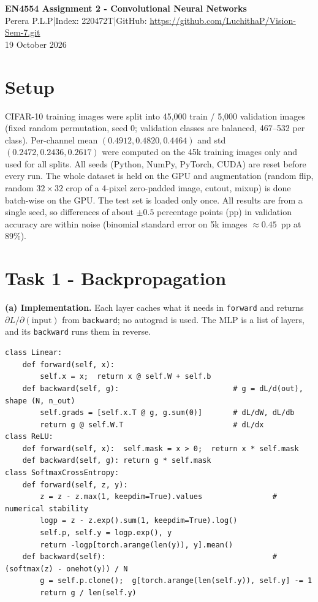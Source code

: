 \documentclass[10pt,a4paper]{article}
\newcommand{\studentname}{Perera P.L.P}
\newcommand{\indexno}{220472T}
\newcommand{\githuburl}{https://github.com/LuchithaP/Vision-Sem-7.git}
\begin{document}
\begin{center}
{\Large\bfseries EN4554 Assignment 2 - Convolutional Neural Networks}\\[4pt]
\studentname \quad|\quad Index: \indexno \quad|\quad GitHub: \url{\githuburl}\\[2pt]
{\small 19 October 2026}
\end{center}

\section*{Setup}
CIFAR-10 training images were split into 45{,}000 train / 5{,}000 validation images (fixed random permutation, seed 0; validation
classes are balanced, 467--532 per class). Per-channel mean $(0.4912, 0.4820, 0.4464)$ and std $(0.2472, 0.2436, 0.2617)$ were computed
on the 45k training images only and used for all splits. All seeds (Python, NumPy, PyTorch, CUDA) are reset before every run. The
whole dataset is held on the GPU and augmentation (random flip, random $32\times32$ crop of a 4-pixel zero-padded image, cutout, mixup)
is done batch-wise on the GPU. The test set is loaded only once. All results are from a single seed, so differences of about $\pm0.5$ percentage points
(pp) in validation accuracy are within noise (binomial standard error on 5k images $\approx 0.45$~pp at 89\%).

\section{Task 1 - Backpropagation}
\textbf{(a) Implementation.} Each layer caches what it needs in \texttt{forward} and returns $\partial L/\partial(\text{input})$ from
\texttt{backward}; no autograd is used. The MLP is a list of layers, and its \texttt{backward} runs them in reverse.
\begin{lstlisting}
class Linear:
    def forward(self, x):
        self.x = x;  return x @ self.W + self.b
    def backward(self, g):                          # g = dL/d(out), shape (N, n_out)
        self.grads = [self.x.T @ g, g.sum(0)]       # dL/dW, dL/db
        return g @ self.W.T                         # dL/dx
class ReLU:
    def forward(self, x):  self.mask = x > 0;  return x * self.mask
    def backward(self, g): return g * self.mask
class SoftmaxCrossEntropy:
    def forward(self, z, y):
        z = z - z.max(1, keepdim=True).values                # numerical stability
        logp = z - z.exp().sum(1, keepdim=True).log()
        self.p, self.y = logp.exp(), y
        return -logp[torch.arange(len(y)), y].mean()
    def backward(self):                                      # (softmax(z) - onehot(y)) / N
        g = self.p.clone();  g[torch.arange(len(self.y)), self.y] -= 1
        return g / len(self.y)
\end{lstlisting}
\end{document}
